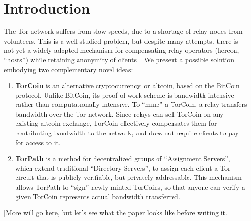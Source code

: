 \section{Introduction}

The Tor network suffers from slow speeds, due to a shortage of relay nodes
from volunteers. This is a well studied problem, but despite many attempts,
there is not yet a widely-adopted mechanism for compensating relay operators
(hereon, ``hosts'') while retaining anonymity of clients~\cite{raykova-
pet2008, wpes09-xpay, incentives-fc10, ccs10-braids, acsac11-tortoise,
jansen2013lira, johnson2013onions}. We present a possible solution, embodying
two complementary novel ideas:

\begin{enumerate}
\item \textbf{TorCoin} is an alternative cryptocurrency, or altcoin, based on the BitCoin protocol\cite{nakamoto2008bitcoin}. Unlike BitCoin, its proof-of-work scheme is bandwidth-intensive, rather than computationally-intensive. To ``mine'' a TorCoin, a relay transfers bandwidth over the Tor network. Since relays can sell TorCoin on any existing altcoin exchange, TorCoin effectively compensates them for contributing bandwidth to the network, and does not require clients to pay for access to it.

\item \textbf{TorPath} is a method for decentralized groups of ``Assignment Servers'', which extend traditional ``Directory Servers'', to assign each client a Tor circuit that is publicly verifiable, but privately addressable. This mechanism allows TorPath to ``sign'' newly-minted TorCoins, so that anyone can verify a given TorCoin represents actual bandwidth transferred. 
\end{enumerate}

[More will go here, but let's see what the paper looks like before writing it.]
